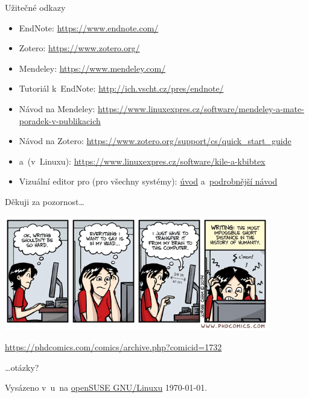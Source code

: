 \documentclass[compress, ucs, xelatex, 11pt, xcolor=svgnames, aspectratio=169,
	hyperref={
		bookmarks=true,
		unicode=true,
		colorlinks=true,
		pdftitle={Citacni software},
		plainpages=false,
		pdfauthor={Vojtech Zeisek},
		pdfsubject={Kratky uvod do citacniho software},
		pdfcreator={XeLaTeX},
		pdfkeywords={citace, reference, software, literatura},
		linkcolor=Crimson, %
		anchorcolor=Magenta, %
		citecolor=Magenta, %
		filecolor=Magenta, %
		menucolor=Magenta, %
		urlcolor=DarkTurquoise, %
		pdftex},
	url={hyphens, lowtilde} %
	]{beamer}
\begin{document}
\begin{frame}{Užitečné odkazy}
	\begin{itemize}
		\item EndNote: \url{https://www.endnote.com/}
		\item Zotero: \url{https://www.zotero.org/}
		\item Mendeley: \url{https://www.mendeley.com/}
		\item Tutoriál k~EndNote: \url{http://ich.vscht.cz/pres/endnote/}
		\item Návod na Mendeley: \url{https://www.linuxexpres.cz/software/mendeley-a-mate-poradek-v-publikacich}
		\item Návod na Zotero: \url{https://www.zotero.org/support/cs/quick_start_guide}
		\item \BibTeX{ }a~\XeLaTeX{ }(v~Linuxu): \url{https://www.linuxexpres.cz/software/kile-a-kbibtex}
		\item Vizuální editor pro \XeLaTeX{ }(pro všechny systémy): \href{https://www.linuxexpres.cz/software/textovy-editor-lyx-latex-pro-line}{úvod} a~\href{https://www.linuxexpres.cz/praxe/diplomka-lyx}{podrobnější návod}
	\end{itemize}
\end{frame}

\begin{frame}{Děkuji za pozornost\ldots}
	\begin{center}
		\includegraphics[height=5cm]{phdcomics_writing.png}
	\end{center}
	\begin{scriptsize}
		\url{https://phdcomics.com/comics/archive.php?comicid=1732}
	\end{scriptsize}
	\begin{flushright}
		\ldots otázky?
	\end{flushright}
	\begin{tiny}
		Vysázeno v~\XeLaTeX u~na \href{https://www.opensuse.org/}{openSUSE GNU/Linuxu} \today.
	\end{tiny}
\end{frame}
\end{document}
